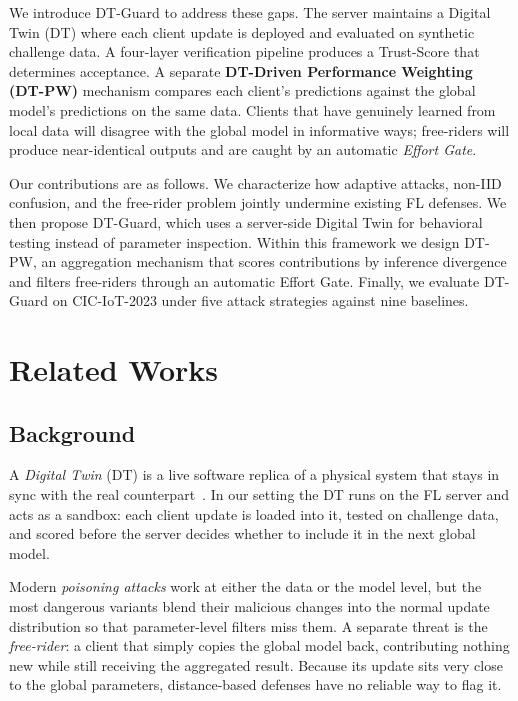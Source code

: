 \documentclass[conference]{IEEEtran}
\begin{document}
We introduce DT-Guard to address these gaps. The server maintains a Digital Twin (DT) where each client update is deployed and evaluated on synthetic challenge data. A four-layer verification pipeline produces a Trust-Score that determines acceptance. A separate \textbf{DT-Driven Performance Weighting (DT-PW)} mechanism compares each client's predictions against the global model's predictions on the same data. Clients that have genuinely learned from local data will disagree with the global model in informative ways; free-riders will produce near-identical outputs and are caught by an automatic \emph{Effort Gate}.

Our contributions are as follows. We characterize how adaptive attacks, non-IID confusion, and the free-rider problem jointly undermine existing FL defenses. We then propose DT-Guard, which uses a server-side Digital Twin for behavioral testing instead of parameter inspection. Within this framework we design DT-PW, an aggregation mechanism that scores contributions by inference divergence and filters free-riders through an automatic Effort Gate. Finally, we evaluate DT-Guard on CIC-IoT-2023 under five attack strategies against nine baselines.


\section{Related Works}


\subsection{Background}

A \emph{Digital Twin} (DT) is a live software replica of a physical system that stays in sync with the real counterpart~\cite{issa2025dtbfl}. In our setting the DT runs on the FL server and acts as a sandbox: each client update is loaded into it, tested on challenge data, and scored before the server decides whether to include it in the next global model.

Modern \emph{poisoning attacks} work at either the data or the model level, but the most dangerous variants blend their malicious changes into the normal update distribution so that parameter-level filters miss them. A separate threat is the \emph{free-rider}: a client that simply copies the global model back, contributing nothing new while still receiving the aggregated result. Because its update sits very close to the global parameters, distance-based defenses have no reliable way to flag it.
\end{document}
